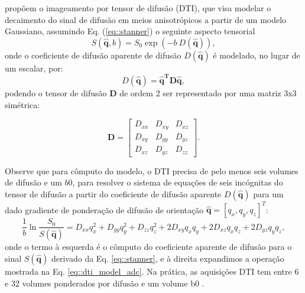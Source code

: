 \documentclass[
    12pt,                %
    oneside,            %
    a4paper,            %
    english,            %
    french,                %
    spanish,            %
    brazil                %
    ]{abntex2}
\begin{document}
 propõem o imageamento por tensor de difusão (DTI), que visa modelar o decaimento do sinal de difusão em meios anisotrópicos a partir de um modelo Gaussiano, assumindo Eq. (\ref {eq::stanner}) o seguinte aspecto tensorial
\begin{equation}
\label{eq::dti_model}
    S(\mathbf{\hat{q}}, b) = S_0\exp{(-b~D(\mathbf{\hat{q}}))}, 
\end{equation}
onde o coeficiente de difusão aparente de difusão $D(\mathbf{\hat{q}})$ é modelado, no lugar de um escalar, por:
\begin{equation}
\label{eq::dti_model_adc}
    D(\mathbf{\hat{q}}) = \mathbf{\hat{q}^T}\mathbf{D}\mathbf{\hat{q}},
\end{equation} 
podendo o tensor de difusão $\mathbf{D}$ de ordem 2  ser representado por uma matriz 3x3 simétrica:

\begin{equation}
\label{eq::tensor}
\mathbf{D} = 
\begin{bmatrix}
D_{xx} & D_{xy} & D_{xz} \\ 
D_{xy} & D_{yy} & D_{yz} \\ 
D_{xz} & D_{yz} & D_{zz}  
\end{bmatrix}.
\end{equation}


Observe que para cômputo do modelo, o DTI precisa de pelo menos seis volumes de difusão e um $b0$, para resolver o sistema de equações de seis incógnitas do tensor de difusão a partir do coeficiente de difusão aparente $D(\mathbf{\hat{q}})$ para um dado gradiente de ponderação de difusão de orientação $\mathbf{\hat{q}} = [q_x, q_y, q_z]^T$:
\begin{equation}
\label{eq::sistema_dti}
\frac{1}{b}\ln{\frac{S_0}{S(\mathbf{\hat{q}})}}=D_{x x} q_{x}^{2} +D_{y y} q_{y}^{2}+D_{z z} q_{z}^{2}+2 D_{x y} q_{x} q_{y} +2 D_{x z} q_{x} q_{z}+2 D_{y z} q_{y} q_{z} ,
\end{equation}
onde o termo à esquerda é o cômputo do coeficiente aparente de difusão para o sinal $S(\mathbf{\hat{q}})$ derivado da Eq. \ref{eq::stanner}, e à direita expandimos a operação mostrada na Eq. \ref{eq::dti_model_adc}. Na prática, as aquisições DTI tem entre 6 e 32 volumes ponderados por difusão e um volume b0 \cite{descoteaux2015}. 
\end{document}
